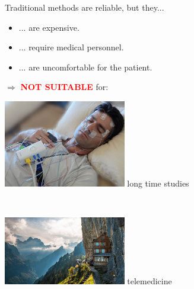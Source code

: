 \documentclass{beamer}
\begin{document}
\begin{frame}{Traditional methods are reliable, but they...}
\pause
	\begin{itemize}[label=\negativeaspect]
		\item ... are expensive. \pause
		\item ... require medical personnel. \pause
		\item ... are uncomfortable for the patient. \pause
	\end{itemize}
	$\Rightarrow$ \textcolor{red}{\textbf{NOT SUITABLE}} for:\\
	\vspace{0.2cm} \pause
	\begin{minipage}[t]{\textwidth}
		\includegraphics[width=0.4\textwidth, align=c]{Sleep-Lab-facilities.jpg}
		\hspace{2cm}
		long time studies
	\end{minipage}\\ \pause
	\begin{minipage}[t]{\textwidth}
		\includegraphics[width=0.4\textwidth, align=c]{berggasthaus_aescher.jpg}
		\hspace{2cm}
		telemedicine
	\end{minipage}
\end{frame}
\end{document}
